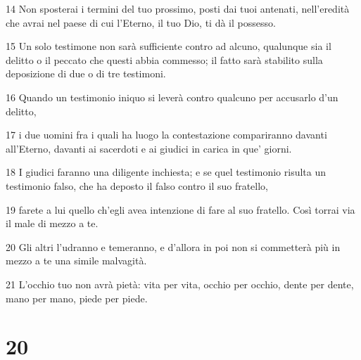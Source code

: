 \par 14 Non sposterai i termini del tuo prossimo, posti dai tuoi antenati, nell'eredità che avrai nel paese di cui l'Eterno, il tuo Dio, ti dà il possesso.
\par 15 Un solo testimone non sarà sufficiente contro ad alcuno, qualunque sia il delitto o il peccato che questi abbia commesso; il fatto sarà stabilito sulla deposizione di due o di tre testimoni.
\par 16 Quando un testimonio iniquo si leverà contro qualcuno per accusarlo d'un delitto,
\par 17 i due uomini fra i quali ha luogo la contestazione compariranno davanti all'Eterno, davanti ai sacerdoti e ai giudici in carica in que' giorni.
\par 18 I giudici faranno una diligente inchiesta; e se quel testimonio risulta un testimonio falso, che ha deposto il falso contro il suo fratello,
\par 19 farete a lui quello ch'egli avea intenzione di fare al suo fratello. Così torrai via il male di mezzo a te.
\par 20 Gli altri l'udranno e temeranno, e d'allora in poi non si commetterà più in mezzo a te una simile malvagità.
\par 21 L'occhio tuo non avrà pietà: vita per vita, occhio per occhio, dente per dente, mano per mano, piede per piede.

\chapter{20}

